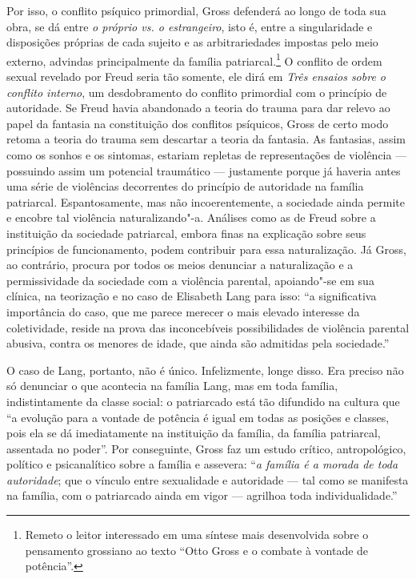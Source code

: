 Por isso, o conflito psíquico primordial, Gross defenderá ao longo de
toda sua obra, se dá entre \emph{o próprio vs. o estrangeiro}, isto é,
entre a singularidade e disposições próprias de cada sujeito e as
arbitrariedades impostas pelo meio externo, advindas principalmente da
família patriarcal.\footnote{Remeto o leitor interessado em uma síntese
  mais desenvolvida sobre o pensamento grossiano ao texto ``Otto Gross e
  o combate à vontade de potência''.} O conflito de ordem sexual
revelado por Freud seria tão somente, ele dirá em \emph{Três ensaios
sobre o conflito interno}, um desdobramento do conflito primordial com
o princípio de autoridade. Se Freud havia abandonado a teoria do trauma
para dar relevo ao papel da fantasia na constituição dos conflitos
psíquicos, Gross de certo modo retoma a teoria do trauma sem descartar a
teoria da fantasia. As fantasias, assim como os sonhos e os sintomas,
estariam repletas de representações de violência --- possuindo assim um
potencial traumático --- justamente porque já haveria antes uma série de
violências decorrentes do princípio de autoridade na família patriarcal.
Espantosamente, mas não incoerentemente, a sociedade ainda permite e
encobre tal violência naturalizando"-a. Análises como as de Freud sobre a
instituição da sociedade patriarcal, embora finas na explicação sobre
seus princípios de funcionamento, podem contribuir para essa
naturalização. Já Gross, ao contrário, procura por todos os meios
denunciar a naturalização e a permissividade da sociedade com a
violência parental, apoiando"-se em sua clínica, na teorização e no caso
de Elisabeth Lang para isso: ``a significativa importância do caso, que
me parece merecer o mais elevado interesse da coletividade, reside na
prova das inconcebíveis possibilidades de violência parental abusiva,
contra os menores de idade, que ainda são admitidas pela sociedade.''

O caso de Lang, portanto, não é único. Infelizmente, longe disso. Era
preciso não só denunciar o que acontecia na família Lang, mas em toda
família, indistintamente da classe social: o patriarcado está tão
difundido na cultura que ``a evolução para a vontade de potência é igual
em todas as posições e classes, pois ela se dá imediatamente na
instituição da família, da família patriarcal, assentada no poder''.
Por conseguinte, Gross faz um estudo crítico, antropológico, político e
psicanalítico sobre a família e assevera: ``\emph{a família é a morada
de toda autoridade}; que o vínculo entre sexualidade e autoridade ---
tal como se manifesta na família, com o patriarcado ainda em vigor ---
agrilhoa toda individualidade.''

